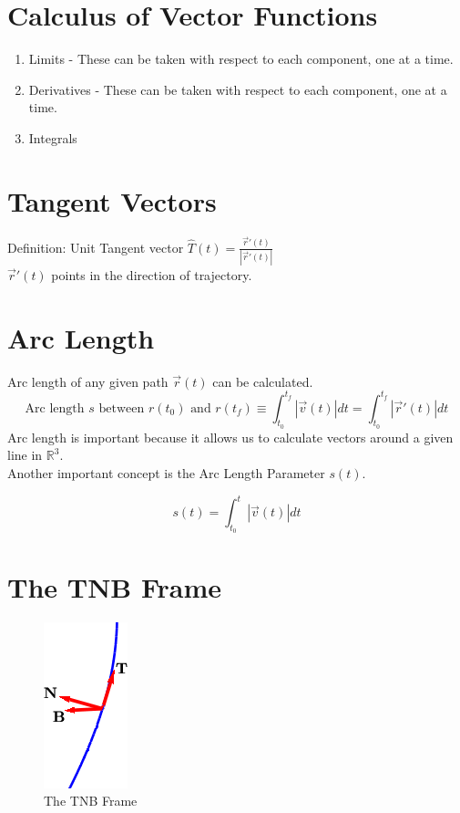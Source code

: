 \documentclass{article}
\begin{document}
\section{Calculus of Vector Functions}
\begin{enumerate}
\item Limits - These can be taken with respect to each component, one at a time.
\item Derivatives - These can be taken with respect to each component, one at a time.
\item Integrals
\end{enumerate}

\section{Tangent Vectors}
Definition: Unit Tangent vector $\hat{T}(t) = \frac{\vec{r}\prime(t)}{|\vec{r}\prime(t)|}$\\
$ \vec{r}\prime(t)$ points in the direction of trajectory.

\section{Arc Length}
Arc length of any given path $\vec{r}(t)$ can be calculated.
\begin{equation}
\text{Arc length }s\text{ between }r(t_0)\text{ and }r(t_f) \equiv \int_{t_0}^{t_f} |\vec{v}(t)|dt = \int_{t_0}^{t_f} |\vec{r}\prime(t)|dt
\end{equation}
Arc length is important because it allows us to calculate vectors around a given line in $\mathbb{R}^3$.\\

Another important concept is the Arc Length Parameter $s(t)$.

\begin{equation}
s(t) = \int_{t_0}^{t} |\vec{v}(t)|dt
\end{equation}

\section{The TNB Frame}
\begin{figure}[h]
\centering
    \includegraphics[scale=1]{tnb.png}
    \caption{The TNB Frame}
\end{figure}
\end{document}

